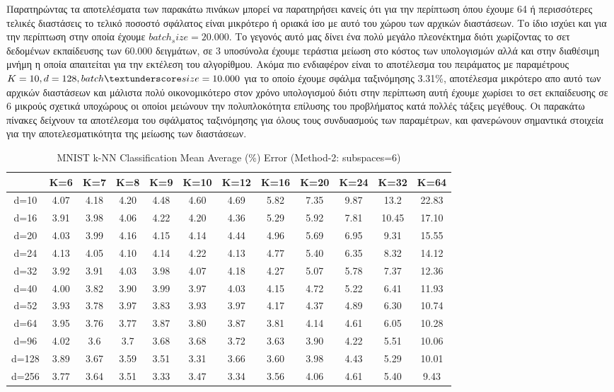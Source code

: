 Παρατηρώντας τα αποτελέσματα των παρακάτω πινάκων μπορεί να παρατηρήσει κανείς ότι για την περίπτωση όπου έχουμε 64 ή περισσότερες τελικές διαστάσεις το τελικό ποσοστό σφάλατος είναι μικρότερο ή οριακά ίσο με αυτό του χώρου των αρχικών διαστάσεων. Το ίδιο ισχύει και για την περίπτωση στην οποία έχουμε $batch_size=20.000$. Το γεγονός αυτό μας δίνει ένα πολύ μεγάλο πλεονέκτημα διότι χωρίζοντας το σετ δεδομένων εκπαίδευσης των 60.000 δειγμάτων, σε 3 υποσύνολα έχουμε τεράστια μείωση στο κόστος των υπολογισμών αλλά και στην διαθέσιμη μνήμη η οποία απαιτείται για την εκτέλεση του αλγορίθμου. Ακόμα πιο ενδιαφέρον είναι το αποτέλεσμα του πειράματος με παραμέτρους $K=10, d=128, batch\textunderscore size=10.000$ για το οποίο έχουμε σφάλμα ταξινόμησης 3.31\%, αποτέλεσμα μικρότερο απο αυτό των αρχικών διαστάσεων και μάλιστα πολύ οικονομικότερο στον χρόνο υπολογισμού διότι στην περίπτωση αυτή έχουμε χωρίσει το σετ εκπαίδευσης σε 6 μικρούς σχετικά υποχώρους οι οποίοι μειώνουν την πολυπλοκότητα επίλυσης του προβλήματος κατά πολλές τάξεις μεγέθους. Οι παρακάτω πίνακες δείχνουν τα αποτέλεσμα του σφάλματος ταξινόμησης για όλους τους συνδυασμούς των παραμέτρων, και φανερώνουν σημαντικά στοιχεία για την αποτελεσματικότητα της μείωσης των διαστάσεων.

\begin{table}[H]
\centering
\label{tab:table1}
\begin{tabular}{|c|c|c|c|c|c|c|c|c|c|c|c|}
\hline
& K=6 & K=7 & K=8 & K=9 & K=10 & K=12 & K=16 & K=20 & K=24 & K=32 & K=64 \\
\hline
d=10 & 4.07 & 4.18 & 4.20 & 4.48 & 4.60 & 4.69 & 5.82 & 7.35 & 9.87 & 13.2 & 22.83 \\
d=16 & 3.91 & 3.98 & 4.06 & 4.22 & 4.20 & 4.36 & 5.29 & 5.92 & 7.81 & 10.45 & 17.10 \\
d=20 & 4.03 & 3.99 & 4.16 & 4.15 & 4.14 & 4.44 & 4.96 & 5.69 & 6.95 & 9.31 & 15.55 \\
d=24 & 4.13 & 4.05 & 4.10 & 4.14 & 4.22 & 4.13 & 4.77 & 5.40 & 6.35 & 8.32 & 14.12 \\
d=32 & 3.92 & 3.91 & 4.03 & 3.98 & 4.07 & 4.18 & 4.27 & 5.07 & 5.78 & 7.37 & 12.36 \\
d=40 & 4.00 & 3.82 & 3.90 & 3.99 & 3.97 & 4.03 & 4.15 & 4.72 & 5.22 & 6.41 & 11.93 \\
d=52 & 3.93 & 3.78 & 3.97 & 3.83 & 3.93 & 3.97 & 4.17 & 4.37 & 4.89 & 6.30 & 10.74 \\
d=64 & 3.95 & 3.76 & 3.77 & 3.87 & 3.80 & 3.87 & 3.81 & 4.14 & 4.61 & 6.05 & 10.28 \\
d=96 & 4.02 & 3.6 & 3.7 & 3.68 & 3.68 & 3.72 & 3.63 & 3.90 & 4.22 & 5.51 & 10.06 \\
d=128 & 3.89 & 3.67 & 3.59 & 3.51 & 3.31 & 3.66 & 3.60 & 3.98 & 4.43 & 5.29 & 10.01 \\
d=256 & 3.77 & 3.64 & 3.51 & 3.33 & 3.47 & 3.34 & 3.56 & 4.06 & 4.61 & 5.40 & 9.43 \\
\hline
\end{tabular}
\caption{MNIST k-NN Classification Mean Average (\%) Error (Method-2: subspaces=6)}
\end{table}

